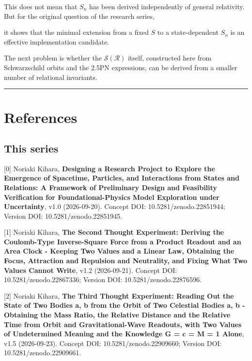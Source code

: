 \documentclass[
  a4paper,
]{article}
\begin{document}
This does not mean that \(S_n\) has been derived independently of
general relativity. But for the original question of the research
series,

\begin{center}
\end{center}

it shows that the minimal extension from a fixed \(S\) to a
state-dependent \(S_n\) is an effective implementation candidate.

The next problem is whether the \(\mathcal S(\mathcal R)\) itself,
constructed here from Schwarzschild orbits and the 2.5PN expressions,
can be derived from a smaller number of relational invariants.

\begin{center}\rule{0.5\linewidth}{0.5pt}\end{center}

\section{References}\label{references}

\subsection{This series}\label{this-series}

{[}0{]} Noriaki Kihara, \textbf{Designing a Research Project to Explore
the Emergence of Spacetime, Particles, and Interactions from States and
Relations: A Framework of Preliminary Design and Feasibility
Verification for Foundational-Physics Model Exploration under
Uncertainty}, v1.0 (2026-09-20). Concept DOI: 10.5281/zenodo.22851944;
Version DOI: 10.5281/zenodo.22851945.

{[}1{]} Noriaki Kihara, \textbf{The Second Thought Experiment: Deriving
the Coulomb-Type Inverse-Square Force from a Product Readout and an Area
Clock - Keeping Two Values and a Linear Law, Obtaining the Focus,
Attraction and Repulsion and Neutrality, and Fixing What Two Values
Cannot Write}, v1.2 (2026-09-21). Concept DOI: 10.5281/zenodo.22867336;
Version DOI: 10.5281/zenodo.22876596.

{[}2{]} Noriaki Kihara, \textbf{The Third Thought Experiment: Reading
Out the State of Two Bodies a, b from the Orbit of Two Celestial Bodies
a, b - Obtaining the Mass Ratio, the Relative Distance and the Relative
Time from Orbit and Gravitational-Wave Readouts, with Two Values of
Undetermined Meaning and the Knowledge G = c = M = 1 Alone}, v1.5
(2026-09-23). Concept DOI: 10.5281/zenodo.22909660; Version DOI:
10.5281/zenodo.22909661.
\end{document}
